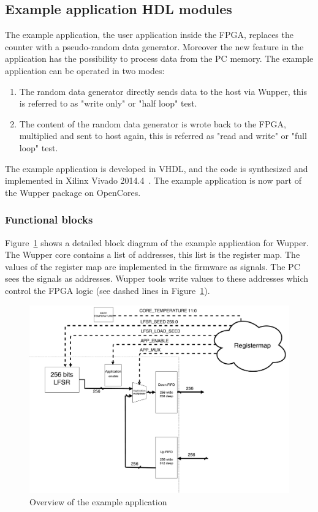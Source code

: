 \subsection{Example application HDL modules}
The example application, the user application inside the FPGA, replaces the counter with a pseudo-random data generator. Moreover the new feature in the application has the possibility to process data from the PC memory. The example application can be operated in two modes:

\begin{enumerate}
	\item The random data generator directly sends data to the host via Wupper, this is referred to as "write only" or "half loop" test. 
	\item The content of the random data generator is wrote back to the FPGA, multiplied and sent to host again, this is referred as "read and write" or "full loop" test.  
	
\end{enumerate}

The example application is developed in VHDL, and the code is synthesized and implemented in Xilinx Vivado 2014.4~\cite{vivadoman}. The example application is now part of the Wupper package on OpenCores. 

\subsubsection {Functional blocks}

Figure~\ref{fig:benchmarkapp} shows a detailed block diagram of the example application for Wupper. The Wupper core contains a list of addresses, this list is the register map. The values of the register map are implemented in the firmware as signals. The PC sees the signals as addresses. Wupper tools write values to these addresses which control the FPGA logic (see dashed lines in Figure~\ref{fig:benchmarkapp}).

\begin{figure}[h]
	\centering
	\includegraphics[width = 0.8 \textwidth]{figures/benchmark_application.pdf}	
	\caption{Overview of the example application}
	\label{fig:benchmarkapp}
\end{figure}

